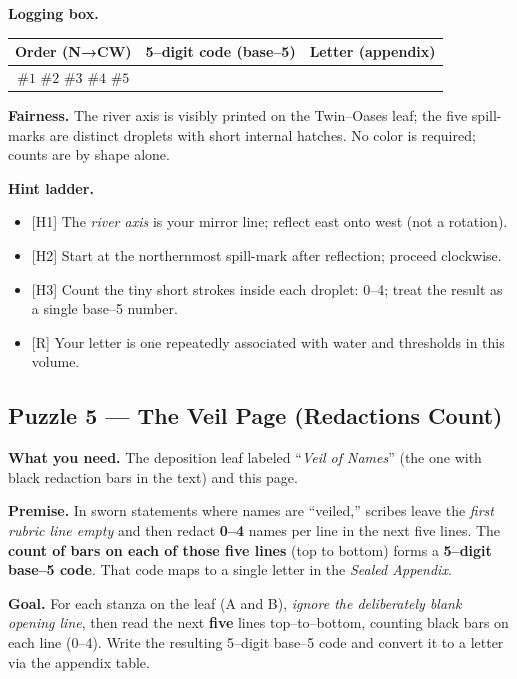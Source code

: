 \documentclass[11pt]{article}
\begin{document}
\begin{itemize}
\medskip
\noindent\textbf{Logging box.}
\begin{center}
\begin{tabular}{c|c|c}
\textbf{Order (N→CW)} & \textbf{5–digit code (base–5)} & \textbf{Letter (appendix)} \\
\hline
\(\#1\) \(\#2\) \(\#3\) \(\#4\) \(\#5\) & \hspace{3.5cm} & \hspace{1.2cm} \\
\end{tabular}
\end{center}

\medskip
\noindent\textbf{Fairness.} The river axis is visibly printed on the Twin–Oases leaf; the five spill-marks are distinct droplets with short internal hatches. No color is required; counts are by shape alone.

\medskip
\noindent\textbf{Hint ladder.}
\begin{itemize}\setlength\itemsep{0.25em}
  \item \textsc{[H1]} The \emph{river axis} is your mirror line; reflect east onto west (not a rotation).
  \item \textsc{[H2]} Start at the northernmost spill-mark after reflection; proceed clockwise.
  \item \textsc{[H3]} Count the tiny short strokes inside each droplet: 0–4; treat the result as a single base–5 number.
  \item \textsc{[R]} Your letter is one repeatedly associated with water and thresholds in this volume.
\end{itemize}

\subsection{Puzzle 5 — The Veil Page (Redactions Count)}
\label{pz:veil-page}

\noindent\textbf{What you need.} The deposition leaf labeled “\textit{Veil of Names}” (the one with black redaction bars in the text) and this page.

\medskip
\noindent\textbf{Premise.} In sworn statements where names are “veiled,” scribes leave the \emph{first rubric line empty} and then redact \textbf{0–4} names per line in the next five lines. The \textbf{count of bars on each of those five lines} (top to bottom) forms a \textbf{5–digit base–5 code}. That code maps to a single letter in the \emph{Sealed Appendix}.

\medskip
\noindent\textbf{Goal.} For each stanza on the leaf (\textsc{A} and \textsc{B}), \emph{ignore the deliberately blank opening line}, then read the next \textbf{five} lines top–to–bottom, counting black bars on each line (0–4). Write the resulting 5–digit base–5 code and convert it to a letter via the appendix table.


\end{itemize}
\end{document}
